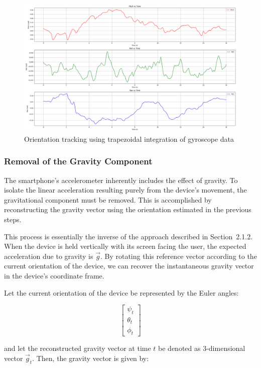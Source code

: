 \documentclass{article}
\begin{document}
\FloatBarrier
\begin{figure}[h]
    \centering
    \includegraphics[width=\textwidth]{2_1_4_1.png}
    \caption{Orientation tracking using trapezoidal integration of gyroscope data}
    \label{fig:gyro_integration}
\end{figure}

\FloatBarrier
\subsubsection{Removal of the Gravity Component}

The smartphone's accelerometer inherently includes the effect of gravity. To isolate the linear acceleration resulting purely from the device’s movement, the gravitational component must be removed. This is accomplished by reconstructing the gravity vector using the orientation estimated in the previous steps.

This process is essentially the inverse of the approach described in Section~2.1.2. When the device is held vertically with its screen facing the user, the expected acceleration due to gravity is $ \vec{g}$. By rotating this reference vector according to the current orientation of the device, we can recover the instantaneous gravity vector in the device's coordinate frame.

Let the current orientation of the device be represented by the Euler angles: 

\[
\begin{bmatrix}\psi_t \\ \theta_t \\ \phi_t\end{bmatrix}
\]

and let the reconstructed gravity vector at time $t$ be denoted as 3-dimensional vector $\vec{g}_t$. Then, the gravity vector is given by:
\end{document}

